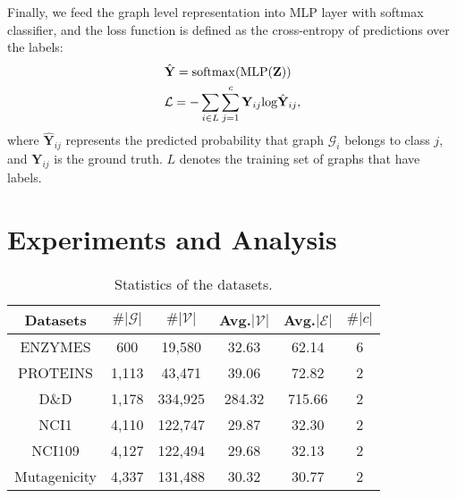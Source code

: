 \documentclass[letterpaper]{article} \usepackage{aaai20}  \usepackage{times}  \usepackage{helvet} \usepackage{courier}  \usepackage[hyphens]{url}  \usepackage{graphicx} \urlstyle{rm} \def\UrlFont{\rm}  \usepackage{graphicx}  \frenchspacing  \setlength{\pdfpagewidth}{8.5in}  \setlength{\pdfpageheight}{11in}
\begin{document}
Finally, we feed the graph level representation into MLP layer with softmax classifier, and the loss function is defined as the cross-entropy of predictions over the labels:
\begin{eqnarray}
	&\hat{\mathbf{Y}} = {\rm softmax}({\rm MLP}(\mathbf{Z})) \nonumber \\ 
	&\mathcal{L} = -\sum_{i \in L}\sum_{j=1}^c\mathbf{Y}_{ij}{\rm log}\hat{\mathbf{Y}}_{ij},
\end{eqnarray}
where $\hat{\mathbf{Y}}_{ij}$ represents the predicted probability that graph $\mathcal{G}_i$ belongs to class $j$, and $\mathbf{Y}_{ij}$ is the ground truth. $L$ denotes the training set of graphs that have labels.

\section{Experiments and Analysis}
\begin{table}[t]
    \centering
    \small
    \resizebox{.95\columnwidth}{!}
    {
    	\begin{tabular}{ c|c|c|c|c|c }
    	\hline
    	Datasets  	& $\#|\mathcal{G}|$ & $\#|\mathcal{V}|$	& Avg.$|\mathcal{V}|$ 	& Avg.$|\mathcal{E}|$ 	& $\#|c|$	\\
    	\hline	
    	ENZYMES     &   600   	  		& 19,580			&  32.63				& 62.14    				& 6 		\\
    	PROTEINS    &   1,113     		& 43,471			&  39.06				& 72.82   				& 2 		\\
    	D\&D		&	1,178	 		& 334,925			&  284.32				& 715.66				& 2 		\\
    	NCI1     	&   4,110    		& 122,747			&  29.87				& 32.30   				& 2 		\\
    	NCI109		&	4,127			& 122,494			&  29.68				& 32.13					& 2 		\\
   		Mutagenicity&	4,337			& 131,488			&  30.32  			 	& 30.77					& 2			\\
    	\hline
    	\end{tabular}
    }
    \caption{Statistics of the datasets.}
    \label{tab:datasets}
\end{table}
\end{document}
